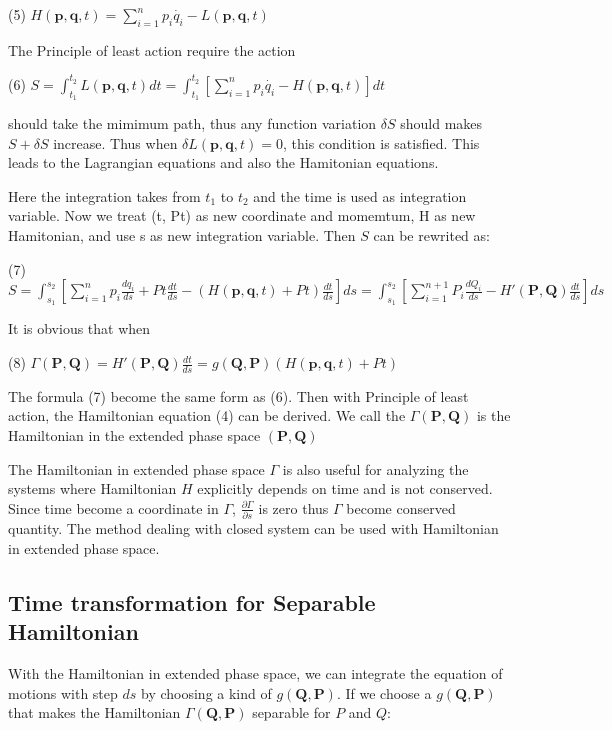 (5) $ H(\mathbf{p},\mathbf{q},t) = \sum_{i=1}^n p_i \dot{q_i} - L(\mathbf{p},\mathbf{q},t) $

The Principle of least action require the action

(6) $ S = \int_{t_1}^{t_2} L(\mathbf{p},\mathbf{q},t) dt = \int_{t_1}^{t_2} \left[ \sum_{i=1}^n p_i \dot{q_i} - H(\mathbf{p},\mathbf{q},t) \right] dt $

should take the mimimum path, thus any function variation $ \delta S $ should makes $ S + \delta S$ increase. Thus when $ \delta L(\mathbf{p},\mathbf{q},t) = 0 $, this condition is satisfied. This leads to the Lagrangian equations and also the Hamitonian equations.

Here the integration takes from $ t_1 $ to $ t_2 $ and the time is used as integration variable. Now we treat (t, Pt) as new coordinate and momemtum, H\textquotesingle{} as new Hamitonian, and use s as new integration variable. Then $S$ can be rewrited as\+:

(7) $ S = \int_{s_1}^{s_2} \left[ \sum_{i=1}^n p_i \frac{d q_i} {d s} + Pt \frac{d t}{d s} - (H(\mathbf{p},\mathbf{q},t) + Pt) \frac{d t}{d s} \right] ds = \int_{s_1}^{s_2} \left[ \sum_{i=1}^{n+1} P_i \frac{d Q_i}{d s} - H'(\mathbf{P},\mathbf{Q}) \frac{d t}{d s}\right] ds $

It is obvious that when

(8) $ \Gamma(\mathbf{P},\mathbf{Q}) = H'(\mathbf{P},\mathbf{Q}) \frac{d t}{d s} = g(\mathbf{Q},\mathbf{P}) (H(\mathbf{p},\mathbf{q},t) + Pt) $

The formula (7) become the same form as (6). Then with Principle of least action, the Hamiltonian equation (4) can be derived. We call the $ \Gamma(\mathbf{P},\mathbf{Q}) $ is the Hamiltonian in the extended phase space $ (\mathbf{P},\mathbf{Q}) $

The Hamiltonian in extended phase space $\Gamma$ is also useful for analyzing the systems where Hamiltonian $H$ explicitly depends on time and is not conserved. Since time become a coordinate in $\Gamma$, $\frac{\partial \Gamma}{\partial s}$ is zero thus $ \Gamma$ become conserved quantity. The method dealing with closed system can be used with Hamiltonian in extended phase space.\hypertarget{index_T_sec}{}\subsection{Time transformation for Separable Hamiltonian}\label{index_T_sec}
With the Hamiltonian in extended phase space, we can integrate the equation of motions with step $ ds $ by choosing a kind of $g(\mathbf{Q},\mathbf{P})$. If we choose a $g(\mathbf{Q},\mathbf{P})$ that makes the Hamiltonian $\Gamma(\mathbf{Q},\mathbf{P})$ separable for $P$ and $Q$\+:

